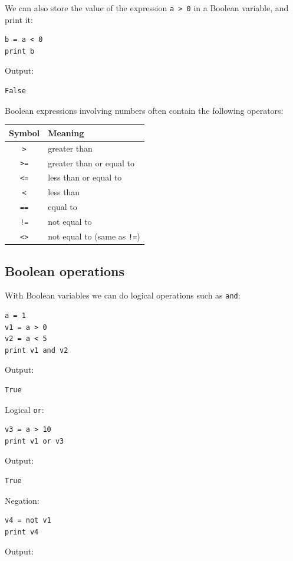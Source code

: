 We can also store the value of the expression {\tt a > 0} in a Boolean variable,
and print it:
\begin{verbatim}
b = a < 0
print b
\end{verbatim}
Output:

\begin{verbatim}
False
\end{verbatim}
Boolean expressions involving numbers often contain the following operators:

\begin{center}
\begin{tabular}{|c|l|}
\hline
Symbol & Meaning \\
\hline
{\tt >} & greater than\\
{\tt >=} & greater than or equal to\\
{\tt <=} & less than or equal to\\
{\tt <} & less than\\
{\tt ==} & equal to\\
{\tt !=} & not equal to\\
{\tt <>} & not equal to (same as {\tt !=})\\
\hline
\end{tabular}
\end{center}

\subsection{Boolean operations}

With Boolean variables we can do logical operations such as {\tt and}:

\begin{verbatim}
a = 1
v1 = a > 0
v2 = a < 5
print v1 and v2
\end{verbatim}
Output:

\begin{verbatim}
True
\end{verbatim}
Logical {\tt or}:

\begin{verbatim}
v3 = a > 10
print v1 or v3
\end{verbatim}
Output:

\begin{verbatim}
True
\end{verbatim}
Negation:

\begin{verbatim}
v4 = not v1
print v4
\end{verbatim}
Output:

